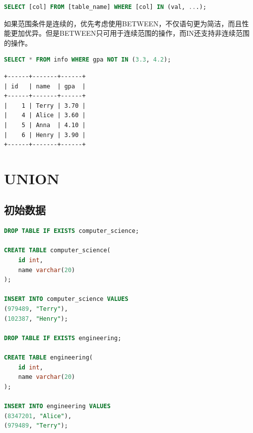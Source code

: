 \documentclass[12pt, openany, oneside]{book}
\begin{document}
\vspace{-0.5cm}

\begin{lstlisting}[language=SQL]
SELECT [col] FROM [table_name] WHERE [col] IN (val, ...);
\end{lstlisting}

如果范围条件是连续的，优先考虑使用BETWEEN，不仅语句更为简洁，而且性能更加优异。但是BETWEEN只可用于连续范围的操作，而IN还支持非连续范围的操作。 \\


\begin{lstlisting}[language=SQL]
SELECT * FROM info WHERE gpa NOT IN (3.3, 4.2);
\end{lstlisting}

\begin{tcolorbox}
    \begin{verbatim}
+------+-------+------+
| id   | name  | gpa  |
+------+-------+------+
|    1 | Terry | 3.70 |
|    4 | Alice | 3.60 |
|    5 | Anna  | 4.10 |
|    6 | Henry | 3.90 |
+------+-------+------+
    \end{verbatim}
\end{tcolorbox}

\newpage

\chapter{UNION}

\section{初始数据}


\begin{lstlisting}[language=SQL]
DROP TABLE IF EXISTS computer_science;

CREATE TABLE computer_science(
	id int,
	name varchar(20)
);

INSERT INTO computer_science VALUES
(979489, "Terry"),
(102387, "Henry");

DROP TABLE IF EXISTS engineering;

CREATE TABLE engineering(
	id int,
	name varchar(20)
);

INSERT INTO engineering VALUES
(8347201, "Alice"),
(979489, "Terry");
\end{lstlisting}
\end{document}
